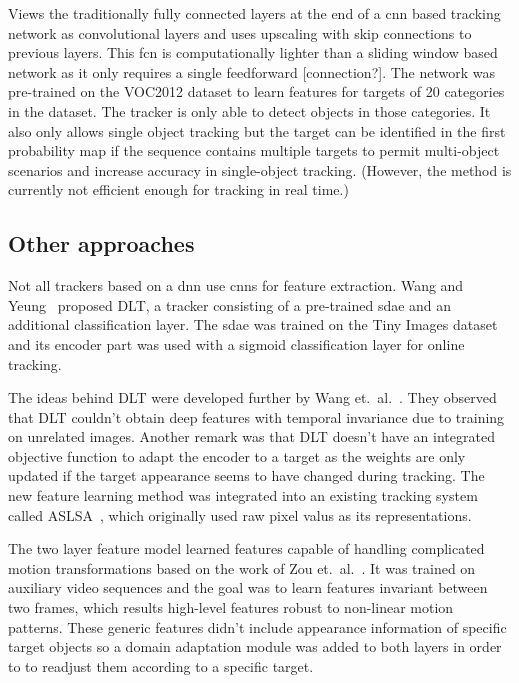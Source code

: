 \cite{FCN_TRACK}
Views the traditionally fully connected layers at the end of a \ac{cnn} based
tracking network as convolutional layers and uses upscaling with skip connections
to previous layers. This \ac{fcn} is computationally lighter than a sliding window
based network as it only requires a single feedforward [connection?]. The network
was pre-trained on the VOC2012 dataset to learn features for targets of 20 categories
in the dataset. The tracker is only able to detect objects in those categories.
It also only allows single object tracking but the target can be identified in the
first probability map if the sequence contains multiple targets to permit multi-object
scenarios and increase accuracy in single-object tracking. (However, the method is
currently not efficient enough for tracking in real time.)

\subsection{Other approaches}
Not all trackers based on a \ac{dnn} use \ac{cnn}s for feature extraction. Wang and
Yeung~\cite{LEARNING_DEEP} proposed DLT, a tracker consisting of a pre-trained \ac{sdae}
and an additional classification layer. The \ac{sdae} was trained on the Tiny Images
dataset and its encoder part was used with a sigmoid classification layer for online
tracking.

The ideas behind DLT were developed further by Wang et.~al.~\cite{LEARNED_HIERARCH}.
They observed that DLT couldn't obtain deep features with temporal invariance due to
training on unrelated images. Another remark was that DLT doesn't have an
integrated objective function to adapt the encoder to a target as the weights
are only updated if the target appearance seems to have changed during tracking.
The new feature learning method was integrated into an existing tracking system called
ASLSA~\cite{ASLSA}, which originally used raw pixel valus as its representations.

The two layer feature model learned features capable of handling complicated motion
transformations based on the work of Zou et.~al.~\cite{INVARIANT_FEATS}. It was trained
on auxiliary video sequences and the goal was to learn features invariant between two
frames, which results high-level features robust to non-linear motion patterns. These
generic features didn't include appearance information of specific target objects so a
domain adaptation module was added to both layers in order to to readjust them according
to a specific target.~\cite{LEARNED_HIERARCH}

